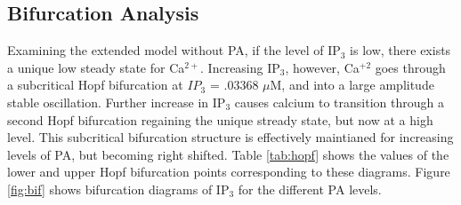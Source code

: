 \documentclass[preprint,12pt]{elsarticle}
\begin{document}

\subsection{Bifurcation Analysis}
Examining the extended model without PA, if the level of IP$_3$ is low, there exists a unique low steady state for Ca$^{2+}$. Increasing IP$_3$, however, Ca$^{+2}$ goes through a subcritical Hopf bifurcation at $IP_3$ =  .03368 $\mu$M, and into a large amplitude stable oscillation. Further increase in IP$_3$ causes calcium to transition through a second Hopf bifurcation regaining the unique stready state, but now at a high level. This subcritical bifurcation structure is effectively maintianed for increasing levels of PA, but becoming right shifted. Table \ref{tab:hopf} shows the values of the lower and upper Hopf bifurcation points corresponding to these diagrams. Figure \ref{fig:bif} shows bifurcation diagrams of IP$_3$ for the different PA levels.
\end{document}

